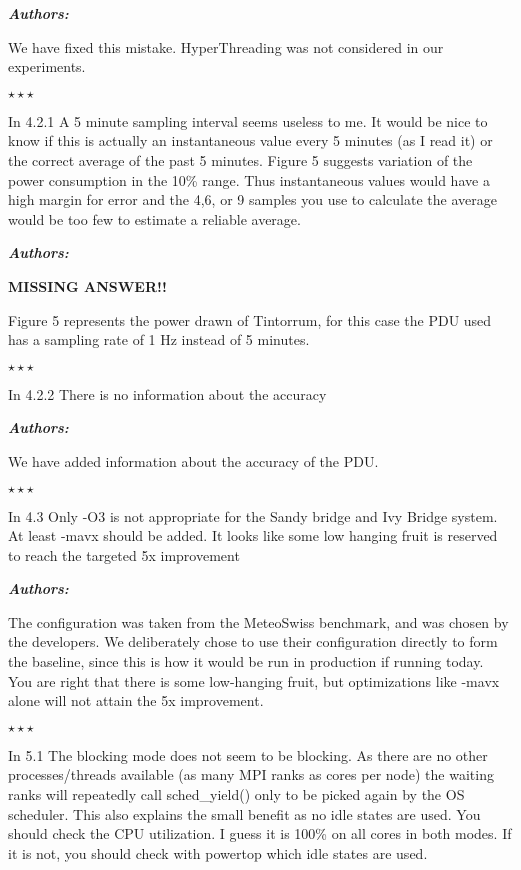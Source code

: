 \documentclass[a4paper,11pt]{article}
\newcounter{question}
\newcommand{\weReply}{\vspace{0.25cm} {\bf \noindent } \addtocounter{question}{1} \textbf{\emph{Authors:}} \medskip \em\par}
\newenvironment{weSay}{\bigskip \weReply \begin{it}}{\end{it}\begin{center} \samepage$\star \star \star$ \end{center}}
\begin{document}
\begin{weSay}
We have fixed this mistake. HyperThreading was not considered in our experiments.
\end{weSay}

In 4.2.1
A 5 minute sampling interval seems useless to me. It would be nice to know if
this is actually an instantaneous value every 5 minutes (as I read it) or the
correct average of the past 5 minutes. Figure 5 suggests variation of the power
consumption in the 10\% range. Thus instantaneous values would have a high margin
for error and the 4,6, or 9 samples you use to calculate the average would be
too few to estimate a reliable average.

\begin{weSay}
\textbf{MISSING ANSWER!!}

Figure 5 represents the power drawn of Tintorrum, for this case the PDU used has a sampling rate of 1 Hz instead of 5 minutes.
\end{weSay}

In 4.2.2
There is no information about the accuracy

\begin{weSay}
We have added information about the accuracy of the PDU.
\end{weSay}

In 4.3
Only -O3 is not appropriate for the Sandy bridge and Ivy Bridge system. At
least -mavx should be added. It looks like some low hanging fruit is reserved
to reach the targeted 5x improvement

\begin{weSay}
The configuration was taken from the MeteoSwiss benchmark, and was chosen by the developers. We deliberately chose to use their configuration directly to form the baseline, since this is how it would be run in production if running today.  You are right that there is some low-hanging fruit, but optimizations like -mavx alone will not attain the 5x improvement.  
\end{weSay}

In 5.1
The blocking mode does not seem to be blocking. As there are no other
processes/threads available (as many MPI ranks as cores per node) the waiting
ranks will repeatedly call sched\_yield() only to be picked again by the OS
scheduler. This also explains the small benefit as no idle states are used.
You should check the CPU utilization. I guess it is 100\% on all cores in both
modes. If it is not, you should check with powertop which idle states are used.
\end{document}

